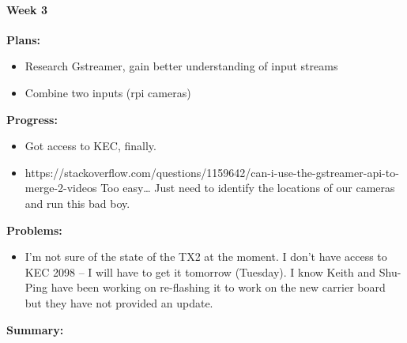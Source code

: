 \paragraph{Week 3}
\begin{adjustwidth}{2.5em}{0pt}
    \vspace{-0.5cm}\textbf{Plans:}
    \vspace{-0.5cm}
    \begin{itemize}
        \item Research Gstreamer, gain better understanding of input streams
        \item Combine two inputs (rpi cameras)
    \end{itemize} 
    \vspace{-0.3cm}\textbf{Progress:}
    \vspace{-0.5cm}
    \begin{itemize}
        \item  Got access to KEC, finally.
        \item https://stackoverflow.com/questions/1159642/can-i-use-the-gstreamer-api-to-merge-2-videos Too easy… Just need to identify the locations of our cameras and run this bad boy.
    \end{itemize} 
    \vspace{-0.3cm}\textbf{Problems:}
    \vspace{-0.5cm}
    \begin{itemize}
        \item I'm not sure of the state of the TX2 at the moment. I don't have access to KEC 2098 -- I will have to get it tomorrow (Tuesday). I know Keith and Shu-Ping have been working on re-flashing it to work on the new carrier board but they have not provided an update.
    \end{itemize}  
    \vspace{-0.3cm}\noindent\textbf{Summary:}\\
    \noindent 
\end{adjustwidth} 


